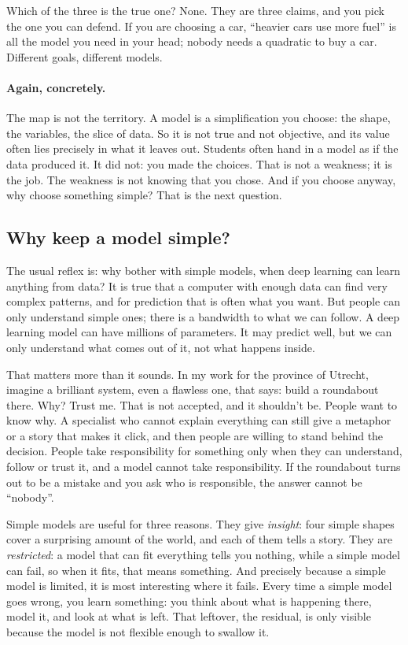 \documentclass[12pt, a4paper]{article}
\theoremstyle{definition}
\theoremstyle{remark}
\newcommand{\againconcretely}{\paragraph{Again, concretely.}}
\begin{document}
Which of the three is the true one? None. They are three claims, and you pick the one you can defend. If you are choosing a car, ``heavier cars use more fuel'' is all the model you need in your head; nobody needs a quadratic to buy a car. Different goals, different models.

\againconcretely
The map is not the territory. A model is a simplification you choose: the shape, the variables, the slice of data. So it is not true and not objective, and its value often lies precisely in what it leaves out. Students often hand in a model as if the data produced it. It did not: you made the choices. That is not a weakness; it is the job. The weakness is not knowing that you chose. And if you choose anyway, why choose something simple? That is the next question.

\subsection{Why keep a model simple?}
\label{sec:why-simple}
The usual reflex is: why bother with simple models, when deep learning can learn anything from data? It is true that a computer with enough data can find very complex patterns, and for prediction that is often what you want. But people can only understand simple ones; there is a bandwidth to what we can follow. A deep learning model can have millions of parameters. It may predict well, but we can only understand what comes out of it, not what happens inside.

That matters more than it sounds. In my work for the province of Utrecht, imagine a brilliant system, even a flawless one, that says: build a roundabout there. Why? Trust me. That is not accepted, and it shouldn't be. People want to know why. A specialist who cannot explain everything can still give a metaphor or a story that makes it click, and then people are willing to stand behind the decision. People take responsibility for something only when they can understand, follow or trust it, and a model cannot take responsibility. If the roundabout turns out to be a mistake and you ask who is responsible, the answer cannot be ``nobody''.

Simple models are useful for three reasons. They give \emph{insight}: four simple shapes cover a surprising amount of the world, and each of them tells a story. They are \emph{restricted}: a model that can fit everything tells you nothing, while a simple model can fail, so when it fits, that means something. And precisely because a simple model is limited, it is most interesting where it fails. Every time a simple model goes wrong, you learn something: you think about what is happening there, model it, and look at what is left. That leftover, the residual, is only visible because the model is not flexible enough to swallow it.
\end{document}
